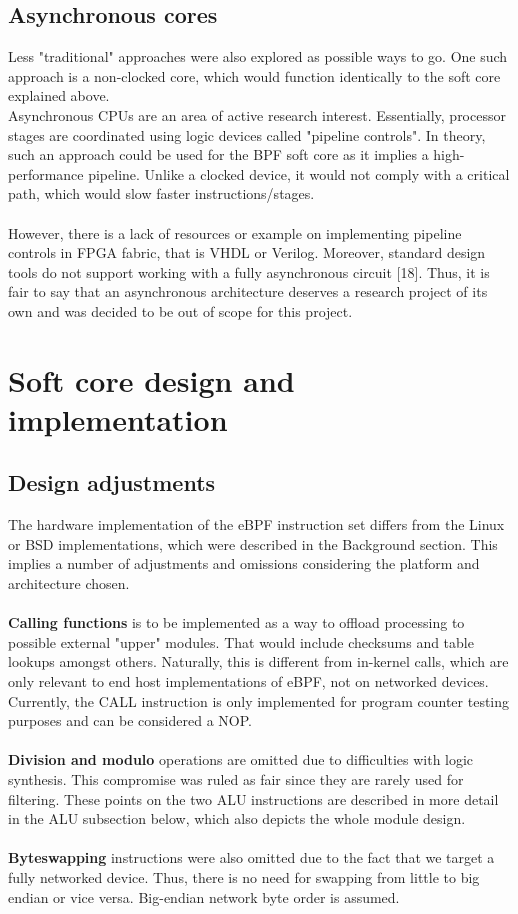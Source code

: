 \documentclass{l4proj}
\begin{document}
\subsection{Asynchronous cores}
Less "traditional" approaches were also explored as possible ways to go. One such approach is a non-clocked core, which would function identically to the soft core explained above.\\
Asynchronous CPUs are an area of active research interest. Essentially, processor stages are coordinated using logic devices called "pipeline controls". In theory, such an approach could be used for the BPF soft core as it implies a high-performance pipeline. Unlike a clocked device, it would not comply with a critical path, which would slow faster instructions/stages.\\\\
However, there is a lack of resources or example on implementing pipeline controls in FPGA fabric, that is VHDL or Verilog. Moreover, standard design tools do not support working with a fully asynchronous circuit [18]. Thus, it is fair to say that an asynchronous architecture deserves a research project of its own and was decided to be out of scope for this project.

\section{Soft core design and implementation}
\subsection{Design adjustments}
The hardware implementation of the eBPF instruction set differs from the Linux or BSD implementations, which were described in the Background section. This implies a number of adjustments and omissions considering the platform and architecture chosen.\\\\
\textbf{Calling functions} is to be implemented as a way to offload processing to possible external "upper" modules. That would include checksums and table lookups amongst others. Naturally, this is different from in-kernel calls, which are only relevant to end host implementations of eBPF, not on networked devices.\\
Currently, the CALL instruction is only implemented for program counter testing purposes and can be considered a NOP.\\\\
\textbf{Division and modulo} operations are omitted due to difficulties with logic synthesis. This compromise was ruled as fair since they are rarely used for filtering. These points on the two ALU instructions are described in more detail in the ALU subsection below, which also depicts the whole module design.\\\\
\textbf{Byteswapping} instructions were also omitted due to the fact that we target a fully networked device. Thus, there is no need for swapping from little to big endian or vice versa. Big-endian network byte order is assumed. 
\newpage
\end{document}
